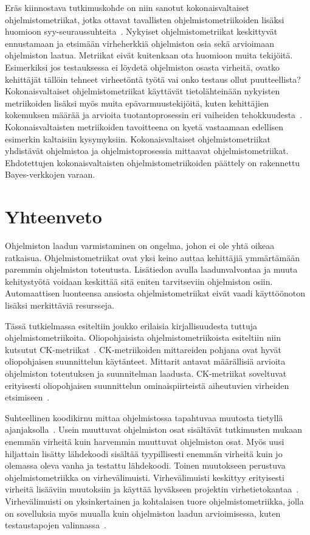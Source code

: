 \documentclass[finnish]{tktltiki2}
\theoremstyle{definition}
\theoremstyle{remark}
\begin{document}
Eräs kiinnostava tutkimuskohde on niin sanotut kokonaisvaltaiset ohjelmistometriikat, jotka ottavat tavallisten ohjelmistometriikoiden lisäksi huomioon syy-seuraussuhteita~\cite{FM00}. Nykyiset ohjelmistometriikat keskittyvät ennustamaan ja etsimään virheherkkiä ohjelmiston osia sekä arvioimaan ohjelmiston laatua. Metriikat eivät kuitenkaan ota huomioon muita tekijöitä. Esimerkiksi jos testauksessa ei löydetä ohjelmiston osasta virheitä, ovatko kehittäjät tällöin tehneet virheetöntä työtä vai onko testaus ollut puutteellista? Kokonaisvaltaiset ohjelmistometriikat käyttävät tietolähteinään nykyisten metriikoiden lisäksi myös muita epävarmuustekijöitä, kuten kehittäjien kokemuksen määrää ja arvioita tuotantoprosessin eri vaiheiden tehokkuudesta~\cite{FM00}. Kokonaisvaltaisten metriikoiden tavoitteena on kyetä vastaamaan edellisen esimerkin kaltaisiin kysymyksiin. Kokonaisvaltaiset ohjelmistometriikat yhdistävät ohjelmistoa ja ohjelmistoprosessia mittaavat ohjelmistometriikat. Ehdotettujen kokonaisvaltaisten ohjelmistometriikoiden päättely on rakennettu  Bayes-verkkojen varaan.

\section{Yhteenveto}

Ohjelmiston laadun varmistaminen on ongelma, johon ei ole yhtä oikeaa ratkaisua. Ohjelmistometriikat ovat yksi keino auttaa kehittäjiä ymmärtämään paremmin ohjelmiston toteutusta. Lisätiedon avulla laadunvalvontaa ja muuta kehitystyötä voidaan keskittää sitä eniten tarvitseviin ohjelmiston osiin. Automaattisen luonteensa ansiosta ohjelmistometriikat eivät vaadi käyttöönoton lisäksi merkittäviä resursseja.

Tässä tutkielmassa esiteltiin joukko erilaisia kirjallisuudesta tuttuja ohjelmistometriikoita. Oliopohjaisista ohjelmistometriikoista esiteltiin niin kutsutut CK-metriikat~\cite{CK94}. CK-metriikoiden mittareiden pohjana ovat hyvät oliopohjaisen suunnittelun käytänteet. Mittarit antavat määrällisiä arvioita ohjelmiston toteutuksen ja suunnitelman laadusta. CK-metriikat soveltuvat erityisesti oliopohjaisen suunnittelun ominaispiirteistä aiheutuvien virheiden etsimiseen~\cite{BBM96, CK94}.

Suhteellinen koodikirnu mittaa ohjelmistossa tapahtuvaa muutosta tietyllä ajanjaksolla~\cite{NB05}. Usein muuttuvat ohjelmiston osat sisältävät tutkimusten mukaan enemmän virheitä kuin harvemmin muuttuvat ohjelmiston osat. Myös uusi hiljattain lisätty lähdekoodi sisältää tyypillisesti enemmän virheitä kuin jo olemassa oleva vanha ja testattu lähdekoodi. Toinen muutokseen perustuva ohjelmistometriikka on virhevälimuisti. Virhevälimuisti keskittyy erityisesti virheitä lisääviin muutoksiin ja käyttää hyväkseen projektin virhetietokantaa~\cite{KZWZ07}. Virhevälimuisti on yksinkertainen ja kohtalaisen tuore ohjelmistometriikka, jolla on sovelluksia myös muualla kuin ohjelmiston laadun arvioimisessa, kuten testaustapojen valinnassa~\cite{WFGWW09}.
\end{document}
